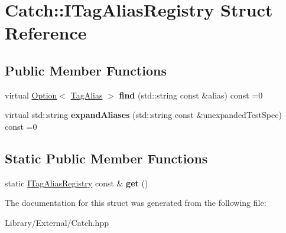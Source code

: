 \hypertarget{struct_catch_1_1_i_tag_alias_registry}{}\section{Catch\+:\+:I\+Tag\+Alias\+Registry Struct Reference}
\label{struct_catch_1_1_i_tag_alias_registry}
\subsection*{Public Member Functions}
\begin{DoxyCompactItemize}
\item 
\hypertarget{struct_catch_1_1_i_tag_alias_registry_a7d2fba4d39cfcc62c2695fcde4f989c3}{}virtual \hyperlink{class_catch_1_1_option}{Option}$<$ \hyperlink{struct_catch_1_1_tag_alias}{Tag\+Alias} $>$ {\bfseries find} (std\+::string const \&alias) const =0\label{struct_catch_1_1_i_tag_alias_registry_a7d2fba4d39cfcc62c2695fcde4f989c3}

\item 
\hypertarget{struct_catch_1_1_i_tag_alias_registry_ae729a7532faf7466db1a157ce0395170}{}virtual std\+::string {\bfseries expand\+Aliases} (std\+::string const \&unexpanded\+Test\+Spec) const =0\label{struct_catch_1_1_i_tag_alias_registry_ae729a7532faf7466db1a157ce0395170}

\end{DoxyCompactItemize}
\subsection*{Static Public Member Functions}
\begin{DoxyCompactItemize}
\item 
\hypertarget{struct_catch_1_1_i_tag_alias_registry_aa9d0f008f49473389c7abf6071f137a7}{}static \hyperlink{struct_catch_1_1_i_tag_alias_registry}{I\+Tag\+Alias\+Registry} const \& {\bfseries get} ()\label{struct_catch_1_1_i_tag_alias_registry_aa9d0f008f49473389c7abf6071f137a7}

\end{DoxyCompactItemize}


The documentation for this struct was generated from the following file\+:\begin{DoxyCompactItemize}
\item 
Library/\+External/Catch.\+hpp\end{DoxyCompactItemize}
